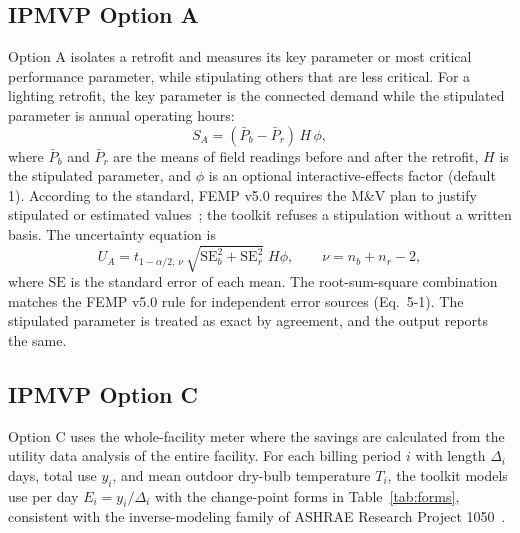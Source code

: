 \documentclass[10pt,twocolumn,letterpaper]{article}
\begin{document}
\subsection{IPMVP Option A}

Option A isolates a retrofit and measures its key parameter or most critical performance parameter, while stipulating others that are less critical. For a lighting retrofit, the key parameter is the connected demand while the stipulated parameter is annual operating hours:
\begin{equation}
S_A = (\bar P_{b}-\bar P_{r})\,H\,\phi,
\label{eq:opta}
\end{equation}
where $\bar P_b$ and $\bar P_r$ are the means of field readings before and after the retrofit, $H$ is the stipulated parameter, and $\phi$ is an optional interactive-effects factor (default 1). According to the standard, FEMP v5.0 requires the M\&V plan to justify stipulated or estimated values~\cite{femp2024}; the toolkit refuses a stipulation without a written basis. The uncertainty equation is
\begin{equation}
U_A = t_{1-\alpha/2,\,\nu}\,\sqrt{\mathrm{SE}_b^2+\mathrm{SE}_r^2}\;H\phi,
\qquad \nu=n_b+n_r-2,
\label{eq:opta_unc}
\end{equation}
where $\mathrm{SE}$ is the standard error of each mean. The root-sum-square combination matches the FEMP v5.0 rule for independent error sources (Eq.~5-1). The stipulated parameter is treated as exact by agreement, and the output reports the same.

\subsection{IPMVP Option C}\label{sec:optc}

Option C uses the whole-facility meter where the savings are calculated from the utility data analysis of the entire facility. For each billing period $i$ with length $\Delta_i$ days, total use $y_i$, and mean outdoor dry-bulb temperature $T_i$, the toolkit models use per day $E_i=y_i/\Delta_i$ with the change-point forms in Table~\ref{tab:forms}, consistent with the inverse-modeling family of ASHRAE Research Project 1050~\cite{kissock2003}.
\end{document}
